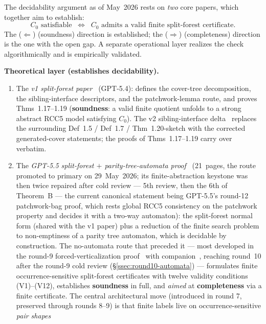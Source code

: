 \documentclass[
]{ceurart}
\theoremstyle{definition}
\begin{document}
The decidability argument as of May~2026 rests on \emph{two}
core papers, which together aim to establish:
\[
  \text{$C_0$ satisfiable}
  \;\;\Longleftrightarrow\;\;
  \text{$C_0$ admits a valid finite split-forest certificate.}
\]
The ($\Leftarrow$) (soundness) direction is established; the
($\Rightarrow$) (completeness) direction is the one with the open
gap.  A separate operational layer realizes the check
algorithmically and is empirically validated.

\medskip\noindent\textbf{Theoretical layer (establishes
decidability).}
\begin{enumerate}
  \item The \emph{v1 split-forest paper}~\cite{SiblingCompleted}
    (GPT-5.4): defines the cover-tree decomposition, the
    sibling-interface descriptors, and the patchwork-lemma route,
    and proves Thms~1.17--1.19 (\textbf{soundness}: a valid
    finite quotient unfolds to a strong abstract RCC5 model
    satisfying $C_0$).  The v2 sibling-interface
    delta~\cite{SiblingInterfaceV2} replaces the surrounding
    Def~1.5 / Def~1.7 / Thm~1.20-sketch with the corrected
    generated-cover statements; the proofs of Thms~1.17--1.19
    carry over verbatim.
  \item The \emph{GPT-5.5 split-forest $+$ parity-tree-automata
    proof}~\cite{GPT55AutomataRoute} (21~pages, the route promoted to
    primary on 29~May~2026; its finite-abstraction keystone was then
    twice repaired after cold review --- 5th review, then the 6th of
    Theorem~B --- the current canonical statement being GPT-5.5's
    round-12 patchwork-bag proof, which rests global RCC5 consistency
    on the patchwork property and decides it with a two-way automaton):
    the split-forest normal form
    (shared with the v1 paper) plus a reduction of the finite search
    problem to non-emptiness of a parity tree automaton, which is
    decidable by construction.  The no-automata route that preceded
    it --- most developed in the round-9 forced-verticalization
    proof~\cite{GPT55Round9Sketch} with
    companion~\cite{GPT55Round9Expanded}, reaching round~10 after the
    round-9 cold review (\S\ref{ssec:round10-automata}) ---
    formulates finite occurrence-sensitive split-forest certificates
    with twelve validity conditions (V1)--(V12), establishes
    \textbf{soundness} in full, and \emph{aimed} at
    \textbf{completeness} via a finite certificate.  The
    central architectural move (introduced in round 7, preserved
    through rounds 8--9) is that finite labels live on
    occurrence-sensitive \emph{pair shapes}

\end{enumerate}
\end{document}
